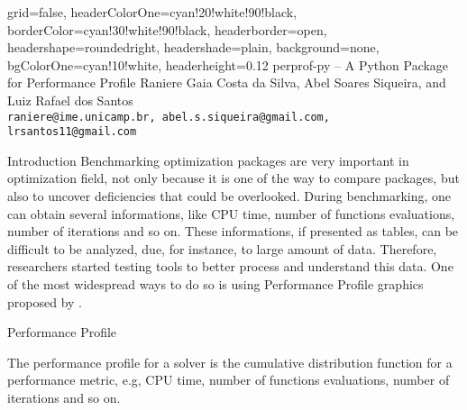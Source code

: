 \documentclass[paperwidth=90cm,paperheight=120cm,portrait]{baposter}
\begin{document}
\begin{poster}{
 grid=false,
 headerColorOne=cyan!20!white!90!black,
 borderColor=cyan!30!white!90!black,
 headerborder=open,
 headershape=roundedright,
 headershade=plain,
 background=none,
 bgColorOne=cyan!10!white,
 headerheight=0.12\textheight}
 {
 }
 {\sc\Huge perprof-py -- A Python Package for Performance Profile}
 { Raniere Gaia Costa da Silva, Abel Soares Siqueira, and Luiz Rafael dos Santos \\[1mm]
 \smaller \texttt{raniere@ime.unicamp.br, abel.s.siqueira@gmail.com, lrsantos11@gmail.com} }
 {
 }

      
      \begin{posterbox}[name=intro,column=0,row=0,span=1]{Introduction}
        Benchmarking optimization packages are very important in optimization
        field, not only because it is one of the way to compare packages, but also
        to uncover deficiencies that could be overlooked. During benchmarking, one
        can obtain several informations, like CPU time, number of functions
        evaluations, number of iterations and so on. These informations, if
        presented as tables, can be difficult to be analyzed, due, for instance,
        to large amount of data. Therefore, researchers started testing tools to
        better process and understand this data.  One of the most widespread ways
        to do so is using Performance Profile graphics proposed by
        \textcite{Dolan2001}.
       \end{posterbox}

       \begin{posterbox}[name=perprof,below=intro]{Performance Profile}  

        The performance profile for a solver is the cumulative distribution
        function for a performance metric, e.g, CPU time, number of functions
        evaluations, number of iterations and so on.


\end{posterbox}
\end{poster}
\end{document}
